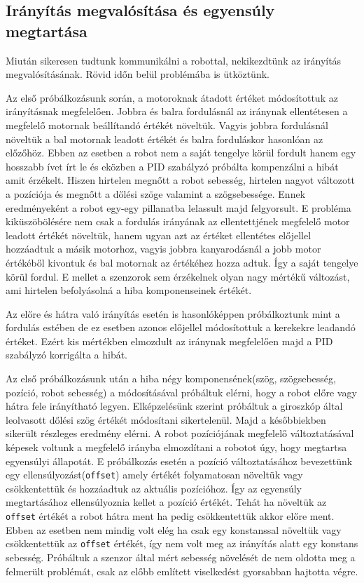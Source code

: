 \subsection{Irányítás megvalósítása és egyensúly megtartása}

Miután sikeresen tudtunk kommunikálni a robottal, nekikezdtünk az irányítás megvalósításának. Rövid időn belül problémába is ütköztünk.

Az első próbálkozásunk során, a motoroknak átadott értéket módosítottuk az irányításnak megfelelően. Jobbra és balra fordulásnál az iránynak ellentétesen a megfelelő motornak beállítandó értékét növeltük. Vagyis jobbra fordulásnál növeltük a bal motornak leadott értékét és balra forduláskor hasonlóan az előzőhöz. Ebben az esetben a robot nem a saját tengelye körül fordult hanem egy hosszabb ívet írt le és eközben a PID szabályzó próbálta kompenzálni a hibát amit érzékelt. Hiszen hirtelen megnőtt a robot sebesség, hirtelen nagyot változott a pozíciója és megnőtt a dőlési szöge valamint a szögsebessége. Ennek eredményeként a robot egy-egy pillanatba lelassult majd felgyorsult. E probléma kiküszöbölésére nem csak a fordulás irányának az ellentettjének megfelelő motor leadott értékét növeltük, hanem ugyan azt az értéket ellentétes előjellel hozzáadtuk a másik motorhoz, vagyis jobbra kanyarodásnál a jobb motor értékéből kivontuk és bal motornak az értékéhez hozza adtuk. Így a saját tengelye körül fordul. E mellet a szenzorok sem érzékelnek olyan nagy mértékű változást, ami hirtelen befolyásolná a hiba komponenseinek értékét.

Az előre és hátra való irányítás esetén is hasonlóképpen próbálkoztunk mint a fordulás estében de ez esetben azonos előjellel módosítottuk a kerekekre leadandó értéket. Ezért kis mértékben elmozdult az iránynak megfelelően majd a PID szabályzó korrigálta a hibát.

Az első próbálkozásunk után a hiba négy komponensének(szög, szögsebesség, pozíció, robot sebesség) a módosításával próbáltuk elérni, hogy a robot előre vagy hátra fele irányítható legyen. Elképzelésünk szerint próbáltuk a giroszkóp által leolvasott dőlési szög értékét módosítani sikertelenül. Majd a későbbiekben sikerült részleges eredmény elérni. A robot pozíciójának megfelelő változtatásával képesek voltunk a megfelelő irányba elmozdítani a robotot úgy, hogy megtartsa egyensúlyi állapotát. E próbálkozás esetén a pozíció változtatásához bevezettünk egy ellensúlyozást(\texttt{offset}) amely értékét folyamatosan növeltük vagy csökkentettük és hozzáadtuk az aktuális pozícióhoz. Így az egyensúly megtartásához ellensúlyoznia kellet a pozíció értékét. Tehát ha növeltük az \texttt{offset} értékét a robot hátra ment ha pedig csökkentettük akkor előre ment. Ebben az esetben nem mindig volt elég ha csak egy konstanssal növeltük vagy csökkentettük az \texttt{offset} értékét, így nem volt meg az irányítás alatt egy konstans sebesség. Próbáltuk a szenzor által mért sebesség növelését de nem oldotta meg a felmerült problémát, csak az előbb említett viselkedést gyorsabban hajtotta végre.

